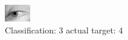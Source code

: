 \begin{figure}[h!]
\begin{center}
\includegraphics[width=0.60\columnwidth]{figures/ID2966_class_3_target_4.png}
\end{center}
\caption{ Classification: 3 actual target: 4}
\label{fig:ID2966_class_3_target_4}
\end{figure}

